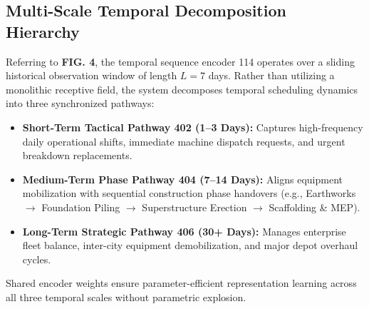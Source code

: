 \documentclass[11pt,a4paper]{article}
\begin{document}
\subsection{Multi-Scale Temporal Decomposition Hierarchy}
\noindent Referring to \textbf{FIG. 4}, the temporal sequence encoder 114 operates over a sliding historical observation window of length $L = 7$ days. Rather than utilizing a monolithic receptive field, the system decomposes temporal scheduling dynamics into three synchronized pathways:
\begin{itemize}
    \item \textbf{Short-Term Tactical Pathway 402 (1--3 Days):} Captures high-frequency daily operational shifts, immediate machine dispatch requests, and urgent breakdown replacements.
    \item \textbf{Medium-Term Phase Pathway 404 (7--14 Days):} Aligns equipment mobilization with sequential construction phase handovers (e.g., Earthworks $\to$ Foundation Piling $\to$ Superstructure Erection $\to$ Scaffolding \& MEP).
    \item \textbf{Long-Term Strategic Pathway 406 (30+ Days):} Manages enterprise fleet balance, inter-city equipment demobilization, and major depot overhaul cycles.
\end{itemize}
Shared encoder weights ensure parameter-efficient representation learning across all three temporal scales without parametric explosion.
\end{document}
